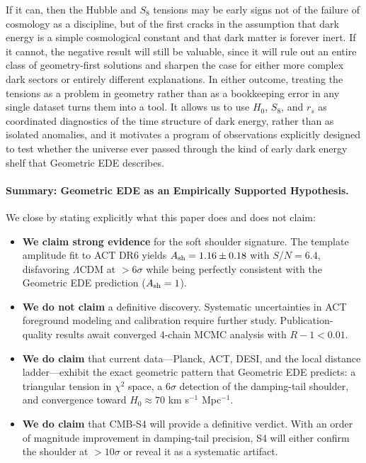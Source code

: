 \documentclass[a4paper,11pt]{article}
\begin{document}
If it can, then the Hubble and $S_8$ tensions may be early signs not of the failure of cosmology as a discipline, but of the first cracks in the assumption that dark energy is a simple cosmological constant and that dark matter is forever inert. If it cannot, the negative result will still be valuable, since it will rule out an entire class of geometry-first solutions and sharpen the case for either more complex dark sectors or entirely different explanations. In either outcome, treating the tensions as a problem in geometry rather than as a bookkeeping error in any single dataset turns them into a tool. It allows us to use $H_0$, $S_8$, and $r_s$ as coordinated diagnostics of the time structure of dark energy, rather than as isolated anomalies, and it motivates a program of observations explicitly designed to test whether the universe ever passed through the kind of early dark energy shelf that Geometric EDE describes.

\paragraph{Summary: Geometric EDE as an Empirically Supported Hypothesis.}
We close by stating explicitly what this paper does and does not claim:
\begin{itemize}
    \item \textbf{We claim strong evidence} for the soft shoulder signature. The template amplitude fit to ACT DR6 yields $A_{\rm sh} = 1.16 \pm 0.18$ with $S/N = 6.4$, disfavoring $\Lambda$CDM at $>6\sigma$ while being perfectly consistent with the Geometric EDE prediction ($A_{\rm sh} = 1$).
    \item \textbf{We do not claim} a definitive discovery. Systematic uncertainties in ACT foreground modeling and calibration require further study. Publication-quality results await converged 4-chain MCMC analysis with $R-1 < 0.01$.
    \item \textbf{We do claim} that current data---Planck, ACT, DESI, and the local distance ladder---exhibit the exact geometric pattern that Geometric EDE predicts: a triangular tension in $\chi^2$ space, a $6\sigma$ detection of the damping-tail shoulder, and convergence toward $H_0 \approx 70$ km s$^{-1}$ Mpc$^{-1}$.
    \item \textbf{We do claim} that CMB-S4 will provide a definitive verdict. With an order of magnitude improvement in damping-tail precision, S4 will either confirm the shoulder at $>10\sigma$ or reveal it as a systematic artifact.
\end{itemize}
\end{document}

